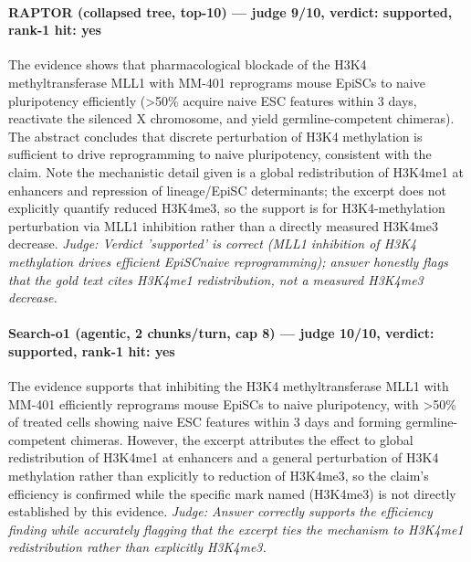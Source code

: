 \documentclass[sigconf, review, anonymous]{acmart}
\begin{document}
\paragraph{RAPTOR (collapsed tree, top-10) --- judge 9/10, verdict: supported, rank-1 hit: yes}
\noindent The evidence shows that pharmacological blockade of the H3K4 methyltransferase MLL1 with MM-401 reprograms mouse EpiSCs to naive pluripotency efficiently (>50\% acquire naive ESC features within 3 days, reactivate the silenced X chromosome, and yield germline-competent chimeras). The abstract concludes that discrete perturbation of H3K4 methylation is sufficient to drive reprogramming to naive pluripotency, consistent with the claim. Note the mechanistic detail given is a global redistribution of H3K4me1 at enhancers and repression of lineage/EpiSC determinants; the excerpt does not explicitly quantify reduced H3K4me3, so the support is for H3K4-methylation perturbation via MLL1 inhibition rather than a directly measured H3K4me3 decrease.
\noindent\small\textit{Judge: Verdict 'supported' is correct (MLL1 inhibition of H3K4 methylation drives efficient EpiSCnaive reprogramming); answer honestly flags that the gold text cites H3K4me1 redistribution, not a measured H3K4me3 decrease.}
\paragraph{Search-o1 (agentic, 2 chunks/turn, cap 8) --- judge 10/10, verdict: supported, rank-1 hit: yes}
\noindent The evidence supports that inhibiting the H3K4 methyltransferase MLL1 with MM-401 efficiently reprograms mouse EpiSCs to naive pluripotency, with >50\% of treated cells showing naive ESC features within 3 days and forming germline-competent chimeras. However, the excerpt attributes the effect to global redistribution of H3K4me1 at enhancers and a general perturbation of H3K4 methylation rather than explicitly to reduction of H3K4me3, so the claim's efficiency is confirmed while the specific mark named (H3K4me3) is not directly established by this evidence.
\noindent\small\textit{Judge: Answer correctly supports the efficiency finding while accurately flagging that the excerpt ties the mechanism to H3K4me1 redistribution rather than explicitly H3K4me3.}
\end{document}
